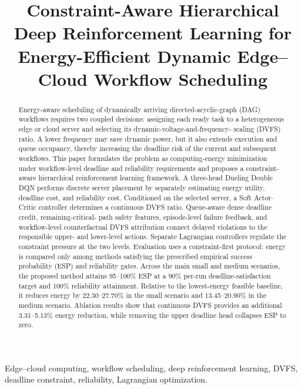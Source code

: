 \documentclass[lettersize,journal]{IEEEtran}
\begin{document}
\title{Constraint-Aware Hierarchical Deep Reinforcement Learning for Energy-Efficient Dynamic Edge--Cloud Workflow Scheduling}

\author{%
}

\maketitle

\begin{abstract}
Energy-aware scheduling of dynamically arriving directed-acyclic-graph (DAG)
workflows requires two coupled decisions: assigning each ready task to a
heterogeneous edge or cloud server and selecting its dynamic-voltage-and-frequency-
scaling (DVFS) ratio. A lower frequency may save dynamic power, but it also
extends execution and queue occupancy, thereby increasing the deadline risk of
the current and subsequent workflows. This paper formulates the problem as
computing-energy minimization under workflow-level deadline and reliability
requirements and proposes a constraint-aware hierarchical reinforcement learning
framework. A three-head Dueling Double DQN performs discrete server placement
by separately estimating energy utility, deadline cost, and reliability cost.
Conditioned on the selected server, a Soft Actor--Critic controller determines
a continuous DVFS ratio. Queue-aware dense deadline credit, remaining-critical-
path safety features, episode-level failure feedback, and workflow-level
counterfactual DVFS attribution connect delayed violations to the responsible
upper- and lower-level actions. Separate Lagrangian controllers regulate the
constraint pressure at the two levels. Evaluation uses a constraint-first
protocol: energy is compared only among methods satisfying the prescribed
empirical success probability (ESP) and reliability gates. Across the main
small and medium scenarios, the proposed method attains 95--100\% ESP at a
90\% per-run deadline-satisfaction target and 100\% reliability attainment.
Relative to the lowest-energy feasible baseline, it reduces energy by
22.30--27.70\% in the small scenario and 13.45--20.90\% in the medium scenario.
Ablation results show that continuous DVFS provides an additional 3.31--5.13\%
energy reduction, while removing the upper deadline head collapses ESP to zero.
\end{abstract}

\begin{IEEEkeywords}
Edge--cloud computing, workflow scheduling, deep reinforcement learning,
DVFS, deadline constraint, reliability, Lagrangian optimization.
\end{IEEEkeywords}
\end{document}
